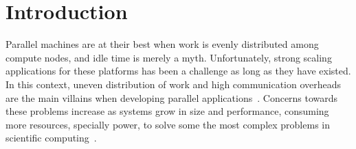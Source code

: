 \section{Introduction}


%
%
%
%
%
%
%
%
%

Parallel machines are at their best when work is evenly distributed among compute nodes, and idle time is merely a myth.
Unfortunately, strong scaling applications for these platforms has been a challenge as long as they have existed.
In this context, uneven distribution of work and high communication overheads are the main villains when developing parallel applications~\cite{Deveci2015, commaware}.
Concerns towards these problems increase as systems grow in size and performance, consuming more resources, specially power, to solve some the most complex problems in scientific computing~\cite{exapower2015,padoin2017energy}.

